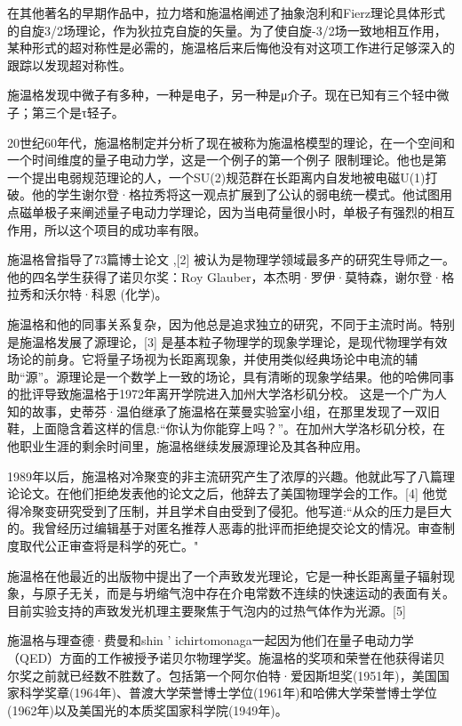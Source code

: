 在其他著名的早期作品中，拉力塔和施温格阐述了抽象泡利和Fierz理论具体形式的自旋3/2场理论，作为狄拉克自旋的矢量。为了使自旋-3/2场一致地相互作用，某种形式的超对称性是必需的，施温格后来后悔他没有对这项工作进行足够深入的跟踪以发现超对称性。

施温格发现中微子有多种，一种是电子，另一种是μ介子。现在已知有三个轻中微子；第三个是τ轻子。

20世纪60年代，施温格制定并分析了现在被称为施温格模型的理论，在一个空间和一个时间维度的量子电动力学，这是一个例子的第一个例子 限制理论。他也是第一个提出电弱规范理论的人，一个SU(2)规范群在长距离内自发地被电磁U(1)打破。他的学生谢尔登·格拉秀将这一观点扩展到了公认的弱电统一模式。他试图用点磁单极子来阐述量子电动力学理论，因为当电荷量很小时，单极子有强烈的相互作用，所以这个项目的成功率有限。

施温格曾指导了73篇博士论文 ,[2] 被认为是物理学领域最多产的研究生导师之一。他的四名学生获得了诺贝尔奖：Roy Glauber，本杰明·罗伊·莫特森，谢尔登·格拉秀和沃尔特·科恩 (化学)。

施温格和他的同事关系复杂，因为他总是追求独立的研究，不同于主流时尚。特别是施温格发展了源理论，[3] 是基本粒子物理学的现象学理论，是现代物理学有效场论的前身。它将量子场视为长距离现象，并使用类似经典场论中电流的辅助“源”。源理论是一个数学上一致的场论，具有清晰的现象学结果。他的哈佛同事的批评导致施温格于1972年离开学院进入加州大学洛杉矶分校。 这是一个广为人知的故事，史蒂芬·温伯继承了施温格在莱曼实验室小组，在那里发现了一双旧鞋，上面隐含着这样的信息:“你认为你能穿上吗？”。在加州大学洛杉矶分校，在他职业生涯的剩余时间里，施温格继续发展源理论及其各种应用。

1989年以后，施温格对冷聚变的非主流研究产生了浓厚的兴趣。他就此写了八篇理论论文。在他们拒绝发表他的论文之后，他辞去了美国物理学会的工作。[4] 他觉得冷聚变研究受到了压制，并且学术自由受到了侵犯。他写道:“从众的压力是巨大的。我曾经历过编辑基于对匿名推荐人恶毒的批评而拒绝提交论文的情况。审查制度取代公正审查将是科学的死亡。"

施温格在他最近的出版物中提出了一个声致发光理论，它是一种长距离量子辐射现象，与原子无关，而是与坍缩气泡中存在介电常数不连续的快速运动的表面有关。目前实验支持的声致发光机理主要聚焦于气泡内的过热气体作为光源。[5]

施温格与理查德·费曼和shin ' ichirtomonaga一起因为他们在量子电动力学（QED）方面的工作被授予诺贝尔物理学奖。施温格的奖项和荣誉在他获得诺贝尔奖之前就已经数不胜数了。包括第一个阿尔伯特·爱因斯坦奖(1951年)，美国国家科学奖章(1964年)、普渡大学荣誉博士学位(1961年)和哈佛大学荣誉博士学位(1962年)以及美国光的本质奖国家科学院(1949年)。


